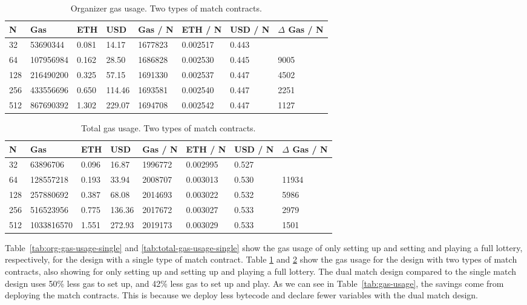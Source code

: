 \begin{table}[h]
\centering
\caption{Organizer gas usage. Two types of match contracts.}
\label{tab:org-gas-usage-dual}
\begin{tabular}{|l|l|l|l|l|l|l|l|}
\hline

N & Gas & ETH & USD & Gas / N & ETH / N & USD / N & $\Delta$ Gas / N \\ \hline
32 & 53690344 & 0.081 & 14.17 & 1677823 & 0.002517 & 0.443 &  \\ \hline
64 & 107956984 & 0.162 & 28.50 & 1686828 & 0.002530 & 0.445 & 9005 \\ \hline
128 & 216490200 & 0.325 & 57.15 & 1691330 & 0.002537 & 0.447 & 4502 \\ \hline
256 & 433556696 & 0.650 & 114.46 & 1693581 & 0.002540 & 0.447 & 2251 \\ \hline
512 & 867690392 & 1.302 & 229.07 & 1694708 & 0.002542 & 0.447 & 1127 \\ \hline

\end{tabular}
\end{table}

\begin{table}[h]
\centering
\caption{Total gas usage. Two types of match contracts.}
\label{tab:total-gas-usage-dual}
\begin{tabular}{|l|l|l|l|l|l|l|l|}
\hline

N & Gas & ETH & USD & Gas / N & ETH / N & USD / N & $\Delta$ Gas / N \\ \hline
32 & 63896706 & 0.096 & 16.87 & 1996772 & 0.002995 & 0.527 &  \\ \hline
64 & 128557218 & 0.193 & 33.94 & 2008707 & 0.003013 & 0.530 & 11934 \\ \hline
128 & 257880692 & 0.387 & 68.08 & 2014693 & 0.003022 & 0.532 & 5986 \\ \hline
256 & 516523956 & 0.775 & 136.36 & 2017672 & 0.003027 & 0.533 & 2979 \\ \hline
512 & 1033816570 & 1.551 & 272.93 & 2019173 & 0.003029 & 0.533 & 1501 \\ \hline

\end{tabular}
\end{table}

\noindent
Table~\ref{tab:org-gas-usage-single} and \ref{tab:total-gas-usage-single} show the gas usage of only setting up and setting and playing a full lottery, respectively, for the design with a single type of match contract. Table \ref{tab:org-gas-usage-dual} and \ref{tab:total-gas-usage-dual} show the gas usage for the design with two types of match contracts, also showing for only setting up and setting up and playing a full lottery.
The dual match design compared to the single match design uses 50\% less gas to set up, and 42\% less gas to set up and play. As we can see in Table~\ref{tab:gas-usage}, the savings come from deploying the match contracts. This is because we deploy less bytecode and declare fewer variables with the dual match design.

